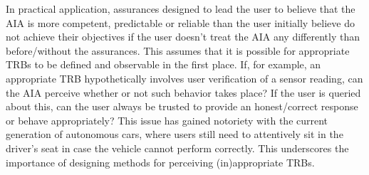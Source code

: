     In practical application, assurances designed to lead the user to believe that the AIA is more competent, predictable or reliable than the user initially believe do not achieve their objectives if the user doesn't treat the AIA any differently than before/without the assurances. 
    This assumes that it is possible for appropriate TRBs to be defined and observable in the first place. 
    If, for example, an appropriate TRB hypothetically involves user verification of a sensor reading, can the AIA perceive whether or not such behavior takes place? 
If the user is queried about this, can the user always be trusted to provide an honest/correct response or behave appropriately? 
This issue has gained notoriety with the current generation of autonomous cars, where users still need to attentively sit in the driver's seat in case the vehicle cannot perform correctly. This underscores the importance of designing methods for perceiving (in)appropriate TRBs. 
%
%
%
